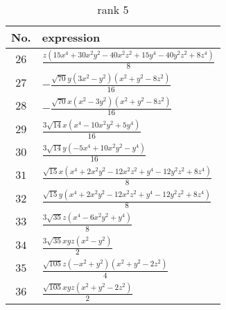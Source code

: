 \documentclass[fleqn,8pt,landscape]{jsarticle}
\begin{document}
\begin{table}[ht!]
\begin{center}
\caption{rank 5}
\renewcommand{\arraystretch}{1.3}
\begin{tabular}{cl} \hline \hline
No. & expression \\ \hline
$ 26 $ & $ \frac{z \left(15 x^{4} + 30 x^{2} y^{2} - 40 x^{2} z^{2} + 15 y^{4} - 40 y^{2} z^{2} + 8 z^{4}\right)}{8} $ \\
$ 27 $ & $ - \frac{\sqrt{70} y \left(3 x^{2} - y^{2}\right) \left(x^{2} + y^{2} - 8 z^{2}\right)}{16} $ \\
$ 28 $ & $ - \frac{\sqrt{70} x \left(x^{2} - 3 y^{2}\right) \left(x^{2} + y^{2} - 8 z^{2}\right)}{16} $ \\
$ 29 $ & $ \frac{3 \sqrt{14} x \left(x^{4} - 10 x^{2} y^{2} + 5 y^{4}\right)}{16} $ \\
$ 30 $ & $ \frac{3 \sqrt{14} y \left(- 5 x^{4} + 10 x^{2} y^{2} - y^{4}\right)}{16} $ \\
$ 31 $ & $ \frac{\sqrt{15} x \left(x^{4} + 2 x^{2} y^{2} - 12 x^{2} z^{2} + y^{4} - 12 y^{2} z^{2} + 8 z^{4}\right)}{8} $ \\
$ 32 $ & $ \frac{\sqrt{15} y \left(x^{4} + 2 x^{2} y^{2} - 12 x^{2} z^{2} + y^{4} - 12 y^{2} z^{2} + 8 z^{4}\right)}{8} $ \\
$ 33 $ & $ \frac{3 \sqrt{35} z \left(x^{4} - 6 x^{2} y^{2} + y^{4}\right)}{8} $ \\
$ 34 $ & $ \frac{3 \sqrt{35} x y z \left(x^{2} - y^{2}\right)}{2} $ \\
$ 35 $ & $ \frac{\sqrt{105} z \left(- x^{2} + y^{2}\right) \left(x^{2} + y^{2} - 2 z^{2}\right)}{4} $ \\
$ 36 $ & $ \frac{\sqrt{105} x y z \left(x^{2} + y^{2} - 2 z^{2}\right)}{2} $ \\
 \hline \hline
\end{tabular}
\end{center}
\end{table}
\end{document}
